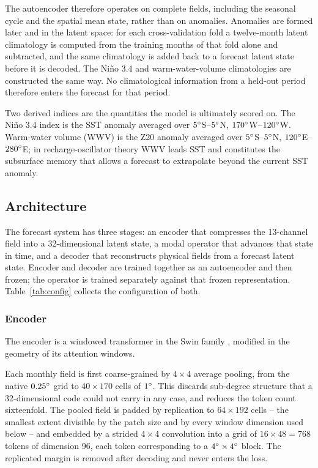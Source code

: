 The autoencoder therefore operates on complete fields, including the seasonal cycle and the
spatial mean state, rather than on anomalies. Anomalies are formed later and in the latent
space: for each cross-validation fold a twelve-month latent climatology is computed from the
training months of that fold alone and subtracted, and the same climatology is added back to a
forecast latent state before it is decoded. The Ni\~no 3.4 and warm-water-volume climatologies
are constructed the same way. No climatological information from a held-out period therefore
enters the forecast for that period.

Two derived indices are the quantities the model is ultimately scored on. The Ni\~no 3.4 index
is the SST anomaly averaged over $5^{\circ}$S--$5^{\circ}$N, $170^{\circ}$W--$120^{\circ}$W. Warm-water volume
(WWV) is the Z20 anomaly averaged over $5^{\circ}$S--$5^{\circ}$N, $120^{\circ}$E--$280^{\circ}$E; in
recharge-oscillator theory \citep{Jin1997} WWV leads SST and constitutes the subsurface memory
that allows a forecast to extrapolate beyond the current SST anomaly.

\subsection{Architecture}
\label{sec:architecture}

The forecast system has three stages: an encoder that compresses the 13-channel field into a
32-dimensional latent state, a modal operator that advances that state in time, and a decoder
that reconstructs physical fields from a forecast latent state. Encoder and decoder are trained
together as an autoencoder and then frozen; the operator is trained separately against that
frozen representation. Table~\ref{tab:config} collects the configuration of both.

\subsubsection{Encoder}
\label{sec:encoder}

The encoder is a windowed transformer in the Swin family \citep{LiuEtAl2021Swin}, modified in
the geometry of its attention windows.

Each monthly field is first coarse-grained by $4\times4$ average pooling, from the native
$0.25^{\circ}$ grid to $40\times170$ cells of $1^{\circ}$. This discards sub-degree structure that a
32-dimensional code could not carry in any case, and reduces the token count sixteenfold. The
pooled field is padded by replication to $64\times192$ cells -- the smallest extent divisible
by the patch size and by every window dimension used below -- and embedded by a strided
$4\times4$ convolution into a grid of $16\times48=768$ tokens of dimension 96, each token
corresponding to a $4^{\circ}\times4^{\circ}$ block. The replicated margin is removed after decoding
and never enters the loss.

